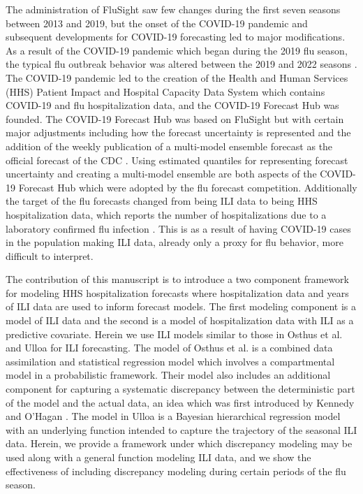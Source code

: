 The administration of FluSight saw few changes during the first seven seasons
between 2013 and 2019, 
but the onset of the COVID-19 pandemic and subsequent developments for COVID-19 
forecasting led to major modifications. As a result of the COVID-19 pandemic 
which began during the 2019 flu season, the typical flu outbreak behavior was 
altered between the 2019 and 2022 seasons \cite[]{mathis2024evaluation}. 
The COVID-19 pandemic led to the creation of the Health and Human Services 
(HHS) Patient Impact and Hospital Capacity Data System 
\cite[]{healthdata2024covidts} which contains COVID-19 and flu hospitalization 
data, and the COVID-19 Forecast Hub was founded. The COVID-19 Forecast Hub 
was based on FluSight but with certain major adjustments including how the 
forecast uncertainty is represented and the addition of the weekly publication 
of a multi-model ensemble forecast as the official forecast of the CDC 
\cite[]{bracher2021evaluating, Cramer2022-hub-dataset}. Using estimated 
quantiles for representing forecast uncertainty and creating a multi-model 
ensemble are both aspects of the COVID-19 Forecast Hub which were adopted by 
the flu forecast competition. Additionally the target of the flu forecasts 
changed from being ILI data to being HHS hospitalization data, which reports 
the number of hospitalizations due to a laboratory confirmed flu infection  
\cite[]{mathis2024evaluation,healthdata2024covidts}. This is as a result of 
having COVID-19 cases in the population making ILI data, already only a proxy 
for flu behavior, more difficult to interpret.



The contribution of this manuscript is to introduce a two component framework 
for modeling HHS hospitalization forecasts where hospitalization data and 
years of ILI data are used to inform forecast models. The first modeling 
component is a model of ILI data and the second is a model of hospitalization 
data with ILI as a predictive covariate.
Herein we use ILI models similar to those in Osthus et al. 
\cite[]{osthus2019dynamic} and Ulloa \cite[]{ulloa2019} for ILI forecasting.
The model of Osthus et al. \cite[]{osthus2019dynamic} is a combined data 
assimilation and statistical regression model which involves a compartmental 
model in a probabilistic framework. Their model also includes an additional 
component for capturing a systematic discrepancy between the deterministic 
part of the model and the actual data, an idea which was first introduced by 
Kennedy and O'Hagan \cite[]{kennedy2001bayesian}. The model in Ulloa 
\cite[]{ulloa2019} is a Bayesian hierarchical regression model with an 
underlying function intended to capture the trajectory of the seasonal 
ILI data. Herein, we provide a framework under which discrepancy modeling may 
be used along with a general function modeling ILI data, and we show the 
effectiveness of including discrepancy modeling during certain periods of 
the flu season. 


